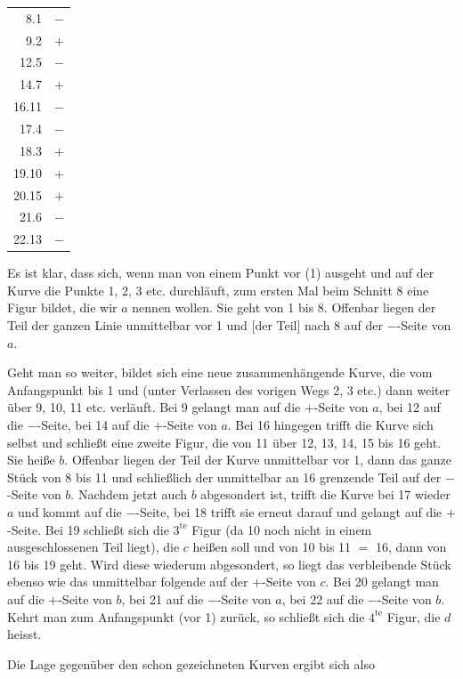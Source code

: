 %
\begin{center}\begin{tabular}{@{}r c@{}}
8.1 & $-$\\
9.2 & $+$\\
12.5 & $-$\\
14.7 & $+$\\
16.11 & $-$\\
17.4 & $-$\\
18.3 & $+$\\
19.10 & $+$\\
20.15 & $+$\\
21.6 & $-$\\
22.13 & $-$\\
\end{tabular}\end{center}

Es ist klar, dass sich, wenn man von einem Punkt vor (1) ausgeht und auf der
Kurve die Punkte 1, 2, 3 etc. durchläuft, zum ersten Mal beim
Schnitt 8 eine Figur bildet, die wir $a$ nennen wollen. Sie geht von 1
bis 8. Offenbar liegen der Teil der ganzen Linie unmittelbar vor 1 und
[der Teil] nach 8 auf der $-$-Seite von $a$.

Geht man so weiter, bildet sich eine neue zusammenhängende
Kurve, die vom Anfangspunkt bis 1 und (unter Verlassen des vorigen Wegs 2, 3 etc.)
dann weiter über 9, 10, 11 etc. verläuft. Bei 9 gelangt man auf die
$+$-Seite von $a$, bei 12 auf die $-$-Seite, bei 14 auf die $+$-Seite von $a$.
Bei 16 hingegen trifft die Kurve sich selbst und schließt eine zweite
Figur, die von 11 über 12, 13, 14, 15 bis 16 geht. Sie heiße $b$.
Offenbar liegen der Teil der Kurve unmittelbar vor 1, dann das ganze
Stück von 8 bis 11 und schließlich der unmittelbar an 16 grenzende Teil auf
der $-$-Seite von $b$. Nachdem jetzt auch $b$ abgesondert ist, trifft die
Kurve bei 17 wieder $a$ und kommt auf die $-$-Seite, bei 18 trifft sie erneut darauf und
gelangt auf die $+$-Seite. Bei 19 schließt sich die $3^{\mathrm{te}}$
Figur (da 10 noch nicht in einem ausgeschlossenen Teil liegt), die
$c$ heißen soll und von 10 bis 11 $=$ 16, dann von 16 bis 19 geht.
Wird diese wiederum abgesondert, so liegt das verbleibende Stück
ebenso wie das unmittelbar folgende auf der $+$-Seite von $c$. Bei 20 gelangt
man auf die $+$-Seite von $b$, bei 21 auf die $-$-Seite von $a$, bei 22
auf die $-$-Seite von $b$. Kehrt man zum Anfangspunkt (vor 1)
zurück, so schließt sich die $4^{\mathrm{te}}$ Figur, die $d$
heisst.
\par{}
Die Lage gegenüber den schon gezeichneten Kurven ergibt sich also
